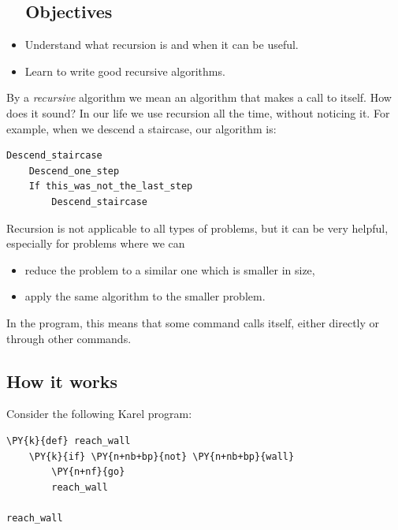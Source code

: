 \subsection{\ \ Objectives} 
 
\begin{itemize}
\item Understand what recursion is and when it can be useful.
\item Learn to write good recursive algorithms.
\end{itemize}
By a {\em recursive} algorithm we mean an algorithm that makes a call to itself. How does it sound?
In our life we use recursion all the time, without noticing it. For example, when we descend 
a staircase, our algorithm is:\\

\begin{bbox}
\begin{Verbatim}[commandchars=\\\{\}]
Descend_staircase
    Descend_one_step
    If this_was_not_the_last_step
        Descend_staircase
\end{Verbatim}
\end{bbox}
\vspace{6mm}

\noindent
Recursion is not applicable to all types of problems, but it can be very 
helpful, especially for problems where we can
\begin{itemize}
\item reduce the problem to a similar one which is smaller in size, 
\item apply the same algorithm to the smaller problem. 
\end{itemize}
In the program, this means that some command calls itself, either 
directly or through other commands.

\subsection[\ \ How it works]{How it works} 

Consider the following Karel program:\\

\begin{bbox}
\begin{Verbatim}[commandchars=\\\{\}]
\PY{k}{def} reach_wall
    \PY{k}{if} \PY{n+nb+bp}{not} \PY{n+nb+bp}{wall}
        \PY{n+nf}{go}
        reach_wall

reach_wall
\end{Verbatim}
\end{bbox}
\vspace{6mm}

